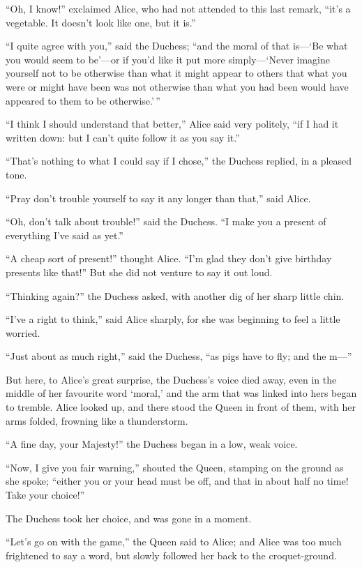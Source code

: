 \documentclass[book, 20pt]{extbook}
\begin{document}
``Oh, I know!'' exclaimed Alice, who had not attended to this last
remark, ``it's a vegetable. It doesn't look like one, but it is.''

``I quite agree with you,'' said the Duchess; ``and the moral of that
is---`Be what you would seem to be'---or if you'd like it put more
simply---`Never imagine yourself not to be otherwise than what it might
appear to others that what you were or might have been was not otherwise
than what you had been would have appeared to them to be otherwise.'\,''

``I think I should understand that better,'' Alice said very politely,
``if I had it written down: but I can't quite follow it as you say it.''

``That's nothing to what I could say if I chose,'' the Duchess replied,
in a pleased tone.

``Pray don't trouble yourself to say it any longer than that,'' said
Alice.

``Oh, don't talk about trouble!'' said the Duchess. ``I make you a
present of everything I've said as yet.''

``A cheap sort of present!'' thought Alice. ``I'm glad they don't give
birthday presents like that!'' But she did not venture to say it out
loud.

``Thinking again?'' the Duchess asked, with another dig of her sharp
little chin.

``I've a right to think,'' said Alice sharply, for she was beginning to
feel a little worried.

``Just about as much right,'' said the Duchess, ``as pigs have to fly;
and the m---''

But here, to Alice's great surprise, the Duchess's voice died away, even
in the middle of her favourite word `moral,' and the arm that was linked
into hers began to tremble. Alice looked up, and there stood the Queen
in front of them, with her arms folded, frowning like a thunderstorm.

``A fine day, your Majesty!'' the Duchess began in a low, weak voice.

``Now, I give you fair warning,'' shouted the Queen, stamping on the
ground as she spoke; ``either you or your head must be off, and that in
about half no time! Take your choice!''

The Duchess took her choice, and was gone in a moment.

``Let's go on with the game,'' the Queen said to Alice; and Alice was
too much frightened to say a word, but slowly followed her back to the
croquet-ground.
\end{document}
